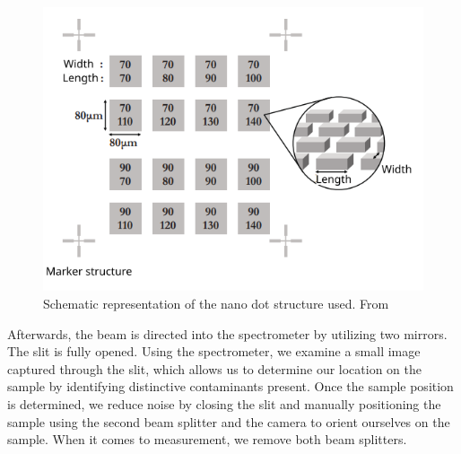 \begin{figure}[ht]
    \centering
    \includegraphics[width = 0.8\linewidth]{Bilder/Setup/SchemeDots.png}
    \caption{Schematic representation of the nano dot structure used. From \cite{LehrstuhlExperimentalphysikIII.2023}}
    \label{fig:NanoDotSketch}
\end{figure}

Afterwards, the beam is directed into the spectrometer by utilizing two mirrors. The slit is fully opened. Using the spectrometer, we examine a small image captured through the slit, which allows us to determine our location on the sample by identifying distinctive contaminants present. Once the sample position is determined, we reduce noise by closing the slit and manually positioning the sample using the second beam splitter and the camera to orient ourselves on the sample. When it comes to measurement, we remove both beam splitters.